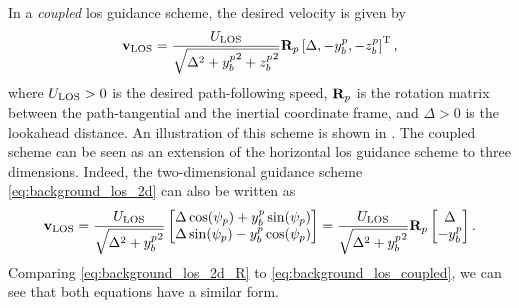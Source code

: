 In a \emph{coupled} \gls{los} guidance scheme, the desired velocity is given by
\begin{equation}
    \mathbf{v}_{\rm LOS} = \frac{U_{\rm LOS}}{\sqrt{\Delta^2 + {y_b^p}^2 + {z_b^p}^2}} \mathbf{R}_p \left[\Delta, -y_b^p, -z_b^p\right]^{\mathrm{T}},
    \label{eq:background_los_coupled}
\end{equation}
where $U_{\rm LOS} > 0$ is the desired path-following speed, $\mathbf{R}_p$ is the rotation matrix between the path-tangential and the inertial coordinate frame, and $\Delta > 0$ is the lookahead distance.
An illustration of this scheme is shown in .
The coupled scheme can be seen as an extension of the horizontal \gls{los} guidance scheme to three dimensions.
Indeed, the two-dimensional guidance scheme \eqref{eq:background_los_2d} can also be written as
\begin{equation}
    \mathbf{v}_{\rm LOS} = 
    \frac{U_{\rm LOS}}{\sqrt{\Delta^2 + {y_b^p}^2}} \begin{bmatrix} \Delta\cos(\psi_p) + y_b^p\sin(\psi_p) \\ \Delta\sin(\psi_p) - y_b^p\cos(\psi_p) \end{bmatrix} = 
    \frac{U_{\rm LOS}}{\sqrt{\Delta^2 + {y_b^p}^2}} \mathbf{R}_p \begin{bmatrix} \Delta \\ -y_b^p \end{bmatrix}. 
    \label{eq:background_los_2d_R}
\end{equation}
Comparing \eqref{eq:background_los_2d_R} to \eqref{eq:background_los_coupled}, we can see that both equations have a similar form.

